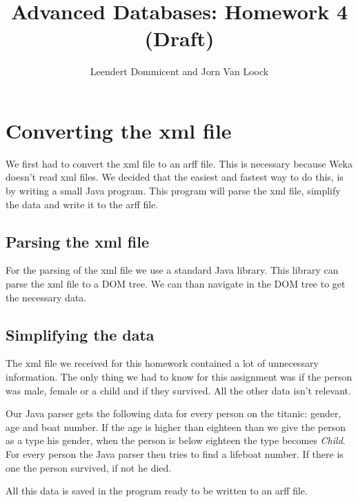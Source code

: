 \documentclass[a4]{article}
\title{Advanced Databases: Homework 4  (Draft)}
\author{Leendert Dommicent and Jorn Van Loock}
\begin{document}
\maketitle
\setlength{\parskip}{5pt}
\setlength{\parindent}{0pt}
\section{Converting the xml file}
We first had to convert the xml file to an arff file. This is necessary because Weka doesn't read xml files. We decided that the easiest and fastest way to do this, is by writing a small Java program. This program will parse the xml file, simplify the data and write it to the arff file.
\subsection{Parsing the xml file}
For the parsing of the xml file we use a standard Java library. This library can parse the xml file to a DOM tree. We can than navigate in the DOM tree to get the necessary data.
\subsection{Simplifying the data}
The xml file we received for this homework contained a lot of unnecessary information. The only thing we had to know for this assignment was if the person was male, female or a child and if they survived. All the other data isn't relevant.\par
Our Java parser gets the following data for every person on the titanic: gender, age and boat number. If the age is higher than eighteen than we give the person as a type his gender, when the person is below eighteen the type becomes \textit{Child}. For every person the Java parser then tries to find a lifeboat number. If there is one the person survived, if not he died.\par
All this data is saved in the program ready to be written to an arff file.
\end{document}
